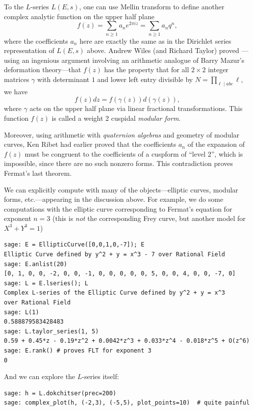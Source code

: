 \documentclass{book}
\theoremstyle{plain}
\theoremstyle{definition}
\numberwithin{equation}{section}
\numberwithin{figure}{section}
\numberwithin{table}{section}
\begin{document}
To the $L$-series $L(E,s)$, one can use
Mellin transform to define another complex analytic function
on the upper half plane
$$
f(z) = \sum_{n\geq 1} a_n e^{2\pi i z} = \sum_{n\geq 1} a_n q^n,
$$
where the coefficients $a_n$ here are exactly the same as
in the Dirichlet series representation of $L(E,s)$ above.
Andrew Wiles (and Richard Taylor) proved \cite{wiles:fermat}---using
an ingenious
argument involving an arithmetic analogue of Barry Mazur's
deformation theory---that
$f(z)$ has the property that for
all $2\times 2$ integer matrices
$\gamma$ with determinant $1$ and lower left entry divisible
by $N=\prod_{\ell\mid abc} \ell$, we have
$$
  f(z) dz = f(\gamma(z)) d(\gamma(z)),
$$
where $\gamma$ acts on the upper half plane
via linear fractional transformations.  This function
$f(z)$ is called a weight 2 cuspidal {\em modular form}.

Moreover, using arithmetic with {\em quaternion algebras} and
geometry of modular curves, Ken Ribet had earlier proved that
the coefficients $a_n$ of the expansion of
$f(z)$ must be congruent to the coefficients
of a cuspform of ``level 2'', which is
impossible, since there are no such nonzero forms.
This contradiction proves Fermat's last theorem.

We can explicitly compute with many of the
objects---elliptic curves, modular forms, etc.---appearing
in the discussion above.
For example, we do some computations with the elliptic
curve corresponding to Fermat's equation for exponent $n=3$
(this is {\em not} the corresponding Frey curve, but another
model for $X^3+Y^3=1$)
\begin{lstlisting}
sage: E = EllipticCurve([0,0,1,0,-7]); E
Elliptic Curve defined by y^2 + y = x^3 - 7 over Rational Field
sage: E.anlist(20)
[0, 1, 0, 0, -2, 0, 0, -1, 0, 0, 0, 0, 0, 5, 0, 0, 4, 0, 0, -7, 0]
sage: L = E.lseries(); L
Complex L-series of the Elliptic Curve defined by y^2 + y = x^3
over Rational Field
sage: L(1)
0.588879583428483
sage: L.taylor_series(1, 5)
0.59 + 0.45*z - 0.19*z^2 + 0.0042*z^3 + 0.033*z^4 - 0.018*z^5 + O(z^6)
sage: E.rank() # proves FLT for exponent 3
0
\end{lstlisting}
And we can explore the $L$-series itself:
\begin{lstlisting}
sage: h = L.dokchitser(prec=200)
sage: complex_plot(h, (-2,3), (-5,5), plot_points=10)  # quite painful
\end{lstlisting}
\end{document}
